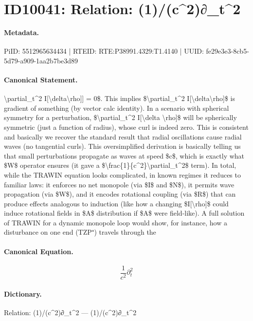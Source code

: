 \section*{ID10041: Relation: (1)/(c\textasciicircum{}2)∂\_t\textasciicircum{}2}
\paragraph{Metadata.}
PiID: 5512965634434 | RTEID: RTE:P38991.4329:T1.4140 | UUID: fe29e3e3-8cb5-5d79-a909-1aa2b7be3d89

\paragraph{Canonical Statement.}
\textbackslash{}partial\_t\textasciicircum{}2 I[\textbackslash{}delta\textbackslash{}rho]] = 0\$. This implies \$\textbackslash{}partial\_t\textasciicircum{}2 I[\textbackslash{}delta\textbackslash{}rho]\$ is gradient of something (by vector calc identity). In a scenario with spherical symmetry for a perturbation, \$\textbackslash{}partial\_t\textasciicircum{}2 I[\textbackslash{}delta \textbackslash{}rho]\$ will be spherically symmetric (just a function of radius), whose curl is indeed zero. This is consistent and basically we recover the standard result that radial oscillations cause radial waves (no tangential curls). This oversimplified derivation is basically telling us that small perturbations propagate as waves at speed \$c\$, which is exactly what \$W\$ operator ensures (it gave a \$\textbackslash{}frac\{1\}\{c\textasciicircum{}2\}\textbackslash{}partial\_t\textasciicircum{}2\$ term). In total, while the TRAWIN equation looks complicated, in known regimes it reduces to familiar laws: it enforces no net monopole (via \$I\$ and \$N\$), it permits wave propagation (via \$W\$), and it encodes rotational coupling (via \$R\$) that can produce effects analogous to induction (like how a changing \$I[\textbackslash{}rho]\$ could induce rotational fields in \$A\$ distribution if \$A\$ were field-like). A full solution of TRAWIN for a dynamic monopole loop would show, for instance, how a disturbance on one end (TZP⁺) travels through the

\paragraph{Canonical Equation.}
\[
\frac{1}{c^2}\partial_t^2
\]

\paragraph{Dictionary.}
Relation: (1)/(c\textasciicircum{}2)∂\_t\textasciicircum{}2 — (1)/(c\textasciicircum{}2)∂\_t\textasciicircum{}2

